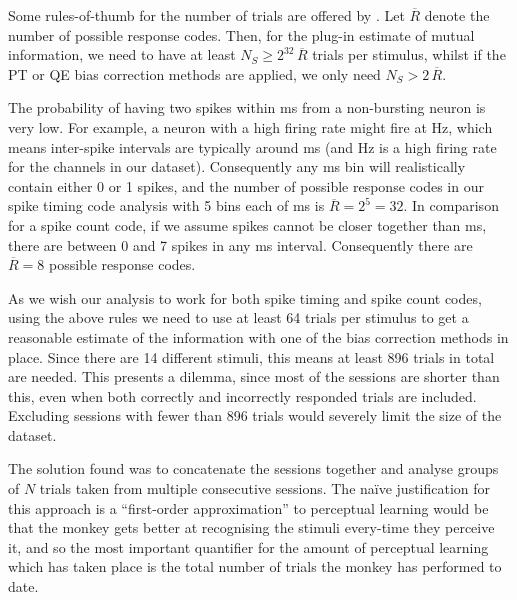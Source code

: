 Some rules-of-thumb for the number of trials are offered by \cite{Panzeri2007}.
Let $\overline{R}$ denote the number of possible response codes.
Then, for the plug-in estimate of mutual information, we need to have at least $N_S \ge 2^{32} \, \overline{R}$ trials per stimulus,
whilst if the \ac{PT} or \ac{QE} bias correction methods are applied, we only need $N_S > 2 \, \overline{R}$.

The probability of having two spikes within \unit[4]{ms} from a non-bursting neuron is very low.
For example, a neuron with a high firing rate might fire at \unit[100]{Hz}, which means inter-spike intervals are typically around \unit[10]{ms} (and \unit[100]{Hz} is a high firing rate for the channels in our dataset).
Consequently any \unit[4]{ms} bin will realistically contain either 0 or 1 spikes, and the number of possible response codes in our spike timing code analysis with 5 bins each of \unit[4]{ms} is $\overline{R} = 2^5 = 32$.
In comparison for a spike count code, if we assume spikes cannot be closer together than \unit[3]{ms}, there are between 0 and 7 spikes in any \unit[20]{ms} interval.
Consequently there are $\overline{R} = 8$ possible response codes.

As we wish our analysis to work for both spike timing and spike count codes, using the above rules we need to use at least 64 trials per stimulus to get a reasonable estimate of the information with one of the bias correction methods in place.
Since there are 14 different stimuli, this means at least 896 trials in total are needed.
This presents a dilemma, since most of the sessions are shorter than this, even when both correctly and incorrectly responded trials are included.
Excluding sessions with fewer than 896 trials would severely limit the size of the dataset.

The solution found was to concatenate the sessions together and analyse groups of $N$ trials taken from multiple consecutive sessions.
The na\"{i}ve justification for this approach is a ``first-order approximation'' to perceptual learning would be that the monkey gets better at recognising the stimuli every-time they perceive it, and so the most important quantifier for the amount of perceptual learning which has taken place is the total number of trials the monkey has performed to date.

